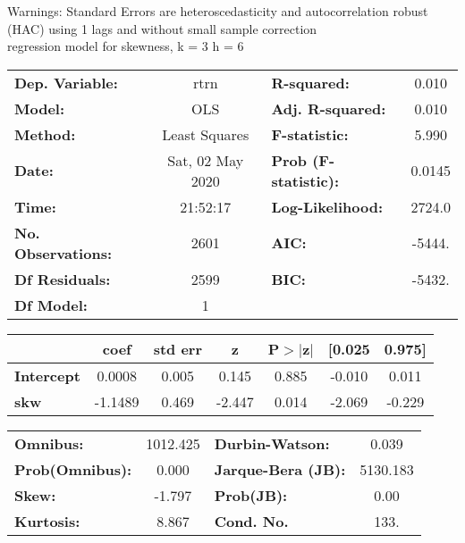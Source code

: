 Warnings: \newline
 [1] Standard Errors are heteroscedasticity and autocorrelation robust (HAC) using 1 lags and without small sample correction\\ 

regression model for skewness, k = 3 h = 6\begin{center}
\begin{tabular}{lclc}
\toprule
\textbf{Dep. Variable:}    &       rtrn       & \textbf{  R-squared:         } &     0.010   \\
\textbf{Model:}            &       OLS        & \textbf{  Adj. R-squared:    } &     0.010   \\
\textbf{Method:}           &  Least Squares   & \textbf{  F-statistic:       } &     5.990   \\
\textbf{Date:}             & Sat, 02 May 2020 & \textbf{  Prob (F-statistic):} &   0.0145    \\
\textbf{Time:}             &     21:52:17     & \textbf{  Log-Likelihood:    } &    2724.0   \\
\textbf{No. Observations:} &        2601      & \textbf{  AIC:               } &    -5444.   \\
\textbf{Df Residuals:}     &        2599      & \textbf{  BIC:               } &    -5432.   \\
\textbf{Df Model:}         &           1      & \textbf{                     } &             \\
\bottomrule
\end{tabular}
\begin{tabular}{lcccccc}
                   & \textbf{coef} & \textbf{std err} & \textbf{z} & \textbf{P$> |$z$|$} & \textbf{[0.025} & \textbf{0.975]}  \\
\midrule
\textbf{Intercept} &       0.0008  &        0.005     &     0.145  &         0.885        &       -0.010    &        0.011     \\
\textbf{skw}       &      -1.1489  &        0.469     &    -2.447  &         0.014        &       -2.069    &       -0.229     \\
\bottomrule
\end{tabular}
\begin{tabular}{lclc}
\textbf{Omnibus:}       & 1012.425 & \textbf{  Durbin-Watson:     } &    0.039  \\
\textbf{Prob(Omnibus):} &   0.000  & \textbf{  Jarque-Bera (JB):  } & 5130.183  \\
\textbf{Skew:}          &  -1.797  & \textbf{  Prob(JB):          } &     0.00  \\
\textbf{Kurtosis:}      &   8.867  & \textbf{  Cond. No.          } &     133.  \\
\bottomrule
\end{tabular}
\end{center}

